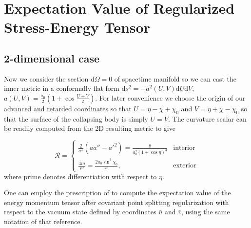 \documentclass[reprint,amsmath,amssymb,aps,nofootinbib]{revtex4-1}
\newcommand{\ud}{\mathrm{d}}
\begin{document}
\section{Expectation Value of Regularized Stress-Energy Tensor}

\subsection{2-dimensional case}
Now we consider the section $\ud\Omega=0$ of spacetime manifold so we can cast the inner metric in a conformally flat form $\ud s^2=-a^2(U,V)\ud U\ud V$, $a(U,V)=\frac{a_0}{2}\left(1+\cos\frac{U+V}{2}\right)$. For later convenience we choose the origin of our advanced and retarded coordinates so that $U=\eta-\chi+\chi_0$ and $V=\eta+\chi-\chi_0$ so that the surface of the collapsing body is simply $U=V$.
The curvature scalar can be readily computed from the 2D resulting metric to give

\begin{equation}
 \mathscr R=
 \begin{cases}
  \frac{2}{a^4}(aa''-a'^2)= \frac{8}{a_0^2(1+\cos\eta)^3} & \text{interior} \\
  \frac{4m}{r^3}=\frac{2a_0\sin^3\chi_0}{r^3}, & \text{exterior}
 \end{cases}
 \label{ricciscalar}
\end{equation}
where prime denotes differentiation with respect to $\eta$.

One can employ the prescription of \cite{DFU} to compute the expectation value of the energy momentum tensor after covariant point splitting regularization with respect to the vacuum state defined by coordinates $\bar u$ and $\bar v$, using the same notation of that reference.
\end{document}
